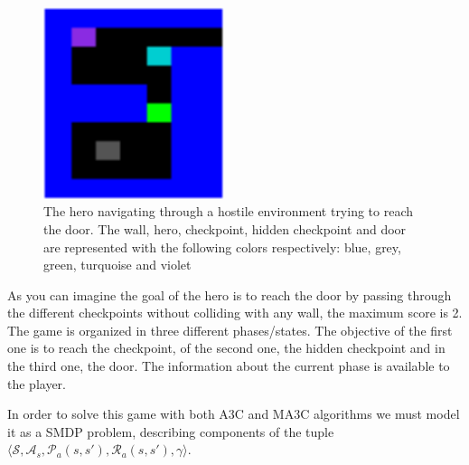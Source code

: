 \begin{figure}[hbtp]
\begin{center}
\includegraphics[width=200]{img/SimpleStates_going_up.png}
\end{center}
\caption[Simple States game]
{The hero navigating through a hostile environment trying to reach the door. The wall, hero, checkpoint, hidden checkpoint
and door are represented with the following colors respectively: blue, grey, green, turquoise and violet}
\label{fig:SimpleStates}
\end{figure}

As you can imagine the goal of the hero is to reach the door by passing through the different checkpoints without colliding
with any wall, the maximum score is 2.
The game is organized in three different phases/states.
The objective of the first one is to reach the checkpoint,
of the second one, the hidden checkpoint and in the third one, the door.
The information about the current phase is available
to the player.

In order to solve this game with both \ac{A3C} and \ac{MA3C} algorithms we must model it as a \ac{SMDP} problem,
describing components of the tuple $\langle\mathcal{S}, \mathcal{A}_s, \mathcal{P}_a(s,s'), \mathcal{R}_a(s,s'), \gamma \rangle$.

